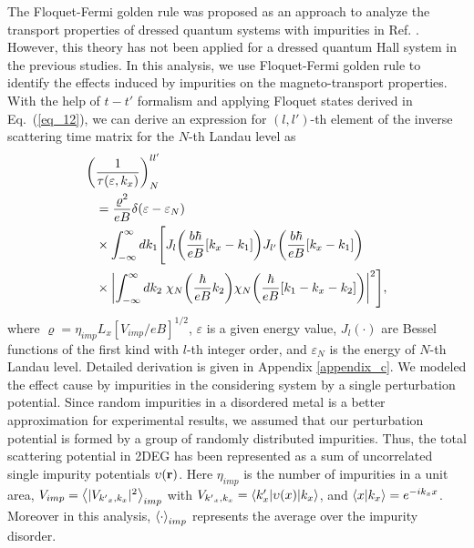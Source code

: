 
The Floquet-Fermi golden rule was proposed as an approach to analyze the transport properties of dressed quantum systems with impurities in Ref. \cite{wackerl20}.
However, this theory has not been applied for a dressed quantum Hall system in the previous studies. In this analysis, we use Floquet-Fermi golden rule to identify the effects induced by impurities on the magneto-transport properties.
With the help of $t-t'$ formalism \cite{wackerl20,grifoni98,sambe75,peskin93,althorpe97} and applying Floquet states derived in Eq.~(\ref{eq_12}), we can derive an  expression for $(l,l')$-th element of the inverse scattering time matrix for the $N$-th Landau level as
\begin{equation} \label{eq_13}
  \begin{aligned}
    \bigg(&\frac{1}{\tau(\varepsilon,k_x)}\bigg)^{ll'}_{N} \\
    & =
    \frac { \varrho^2}{eB}
    \delta(\varepsilon - \varepsilon_{N}) \\
    & \times
    \int_{-\infty}^{\infty} d k_1 \Bigg[
    J_l\qty(\frac{b\hbar}{eB}[{k}_x - k_1])
    J_{l'}\qty(\frac{b\hbar}{eB}[{k}_x - k_1]) \\
    & \times
    \qty|
    \int_{-\infty}^{\infty} dk_2 \;
    {\chi}_{N}\qty(\frac{\hbar}{eB}k_2)
    {\chi}_{N}\qty(\frac{\hbar}{eB} \qty[k_1 - {k}_x - k_2])|^2\Bigg],
  \end{aligned}
\end{equation}
where $\varrho = \eta_{imp} L_x [ { V_{imp}}/{eB}]^{1/2}$, $\varepsilon$ is a given energy value, $J_l(\cdot)$ are Bessel functions of the first kind with $l$-th integer order, and $\varepsilon_N$ is the energy of $N$-th Landau level.
Detailed derivation is given in Appendix \ref{appendix_c}.
We modeled the effect cause by impurities in the considering system by a single perturbation potential.
Since random impurities in a disordered metal is a better approximation for experimental results, we assumed that our perturbation potential is formed by a group of randomly distributed impurities.
Thus, the total scattering potential in 2DEG has been represented as a sum of uncorrelated single impurity potentials $\upsilon(\vb{r})$. Here $\eta_{imp}$ is the number of impurities in a unit area, $V_{imp} = \expval{|V_{{k'}_x,k_x}|^2}_{imp}$ with $V_{{k'}_x,k_x} = \mel**{k'_x}{\upsilon(x) }{k_x}$, and $\braket{x}{k_x} = e^{-ik_x x}$.
Moreover in this analysis, $\expval{\cdot}_{imp}$ represents the average over the impurity disorder.

